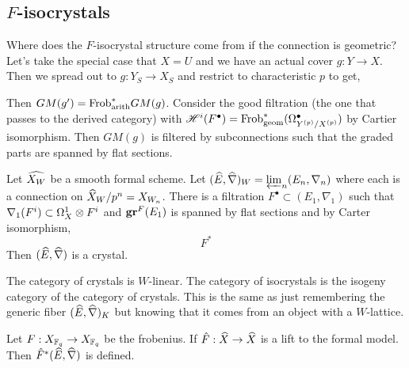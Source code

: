 \documentclass[12pt]{article}
\begin{document}
\subsection{$F$-isocrystals}

Where does the $F$-isocrystal structure come from if the connection is geometric? Let's take the special case that $X = U$ and we have an actual cover $g : Y \to X$. Then we spread out to $g : Y_S \to X_S$ and restrict to characteristic $p$ to get,
\begin{center}
\end{center}
Then $GM(g') = \mathrm{Frob}_{\text{arith}}^* GM(g)$. Consider the good filtration (the one that passes to the derived category) with $\mathscr{H}^i(F^\bullet) = \mathrm{Frob}_{\text{geom}}^* (\Omega^\bullet_{Y^{(p)}/X^{(p)}})$ by Cartier isomorphism. Then $GM(g)$ is filtered by subconnections such that the graded parts are spanned by flat sections.

\begin{defn}
Let $\widehat{X_W}$ be a smooth formal scheme. Let $(\widehat{E}, \widehat{\nabla})_W = \varprojlim_n (E_n, \nabla_n)$ where each is a connection on $\widehat{X}_W / p^n = X_{W_n}$. There is a filtration $F^\bullet \subset (E_1, \nabla_1)$ such that $\nabla_1(F^i) \subset \Omega_X^1 \otimes F^i$ and $\mathbf{gr}^F(E_1)$ is spanned by flat sections and by Carter isomorphism,
\[ F^* \]
Then $(\widehat{E}, \widehat{\nabla})$ is a crystal.
\end{defn}

\begin{defn}
The category of crystals is $W$-linear. The category of isocrystals is the isogeny category of the category of crystals. This is the same as just remembering the generic fiber $(\widehat{E}, \widehat{\nabla})_K$ but knowing that it comes from an object with a $W$-lattice. 
\end{defn}

\begin{rmk}
Let $F : X_{\mathbb{F}_q} \to X_{\mathbb{F}_q}$ be the frobenius. If $\hat{F} : \widehat{X} \to \widehat{X}$ is a lift to the formal model. Then $\hat{F}^* (\widehat{E}, \widehat{\nabla})$ is defined.
\end{rmk}
\end{document}
